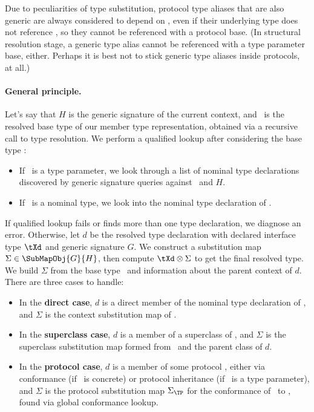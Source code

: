 \documentclass[../generics]{subfiles}
\begin{document}
Due to peculiarities of type substitution, protocol type aliases that are also generic are always considered to depend on \tSelf, even if their underlying type does not reference \tSelf, so they cannot be referenced with a protocol base. (In structural resolution stage, a generic type alias cannot be referenced with a type parameter base, either. Perhaps it is best not to stick generic type aliases inside protocols, at all.)

\paragraph{General principle.} Let's say that $H$ is the generic signature of the current context, and \tT\ is the resolved base type of our member type representation, obtained via a recursive call to type resolution. We perform a qualified lookup after considering the base type \tT:
\begin{itemize}
\item If \tT\ is a type parameter, we look through a list of nominal type declarations discovered by generic signature queries against \tT\ and $H$.
\item If \tT\ is a nominal type, we look into the nominal type declaration of \tT.
\end{itemize}
If qualified lookup fails or finds more than one type declaration, we diagnose an error. Otherwise, let $d$ be the resolved type declaration with declared interface type $\tXd$ and generic signature $G$. We construct a substitution map $\Sigma\in\SubMapObj{G}{H}$, then compute $\tXd\otimes\Sigma$ to get the final resolved type. We build $\Sigma$ from the base type \tT\ and information about the parent context of $d$. There are three cases to handle:
\begin{itemize}
\item In the \textbf{direct case}, $d$ is a direct member of the nominal type declaration of \tT, and $\Sigma$ is the context substitution map of \tT.
\item In the \textbf{superclass case}, $d$ is a member of a superclass of \tT, and $\Sigma$ is the superclass substitution map formed from \tT\ and the parent class of $d$.
\item In the \textbf{protocol case}, $d$ is a member of some protocol \tP, either via conformance (if \tT\ is concrete) or protocol inheritance (if \tT\ is a type parameter), and $\Sigma$ is the protocol substitution map $\Sigma_{\TP}$ for the conformance of \tT\ to \tP, found via global conformance lookup.
\end{itemize}
\end{document}
